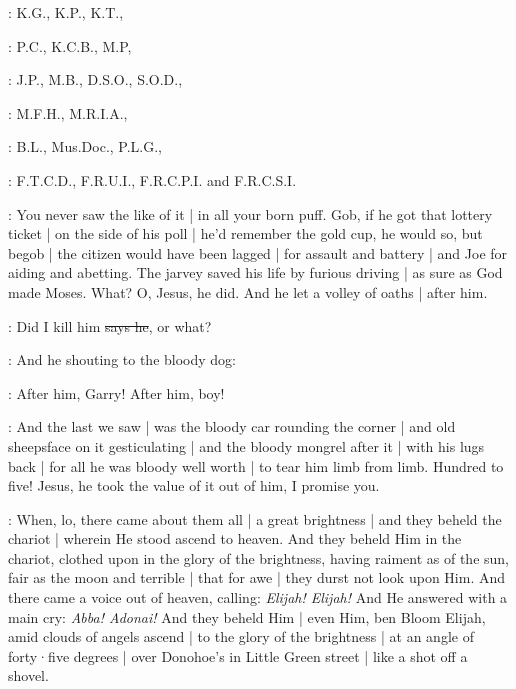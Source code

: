 :
K.G.,
K.P.,
K.T.,

:
P.C.,
K.C.B.,
M.P,

:
J.P.,
M.B.,
D.S.O.,
S.O.D.,

:
M.F.H.,
M.R.I.A.,

:
B.L.,
Mus.Doc.,
P.L.G.,

:
F.T.C.D.,
F.R.U.I.,
F.R.C.P.I.
and F.R.C.S.I.

\Nq:
You never saw the like of it |
in all your born puff.
Gob,
if he got that lottery ticket |
on the side of his poll |
he'd remember the gold cup,
he would so,
but begob |
the citizen would have been lagged |
for assault and battery |
and Joe for aiding and abetting.
The jarvey saved his life by furious driving |
as sure as God made Moses.
What?
O, Jesus,
he did.
And he let a volley of oaths |
after him.

\citizen:
Did I kill him
\sout{says he},
or what?

\Nq:
And he shouting to the bloody dog:

\citizen:
After him,
Garry!
After him,
boy!

\Nq:
And the last we saw |
was the bloody car rounding the corner |
and old sheepsface on it gesticulating |
and the bloody mongrel after it |
with his lugs back |
for all he was bloody well worth |
to tear him limb from limb.
Hundred to five!
Jesus,
he took the value of it out of him,
I promise you.

:
When,
lo,
there came about them all |
a great brightness |
and they beheld the chariot |
wherein He stood ascend to heaven.
And they beheld
Him in the chariot,
clothed upon in the glory of the brightness,
having raiment as of the sun,
fair as the moon and terrible |
that for awe |
they durst not look upon Him.
And there came a voice out of heaven,
calling:
\emph{Elijah!
Elijah!}
And He answered with a main cry:
\emph{Abba!
Adonai!}
And they beheld Him |
even Him,
ben Bloom Elijah,
amid clouds of angels ascend |
to the glory of the brightness |
at an angle of forty·five degrees |
over Donohoe's in Little Green street |
like a shot off a shovel.
